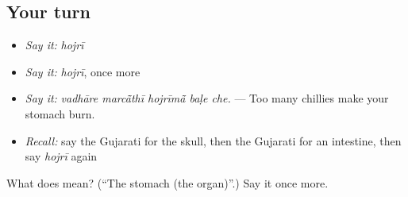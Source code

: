 \subsection*{Your turn}
\begin{itemize}
\raggedright
  \item \emph{Say it:} \emph{hojrī}
  \item \emph{Say it:} \emph{hojrī}, once more
  \item \emph{Say it:} \emph{vadhāre marcā̃thī hojrīmā̃ baḷe che.} — Too many chillies make your stomach burn.
  \item \emph{Recall:} say the Gujarati for the skull, then the Gujarati for an intestine, then say \emph{hojrī} again
\end{itemize}

\begin{tcolorbox}[breakable,colback=teal!4,colframe=teal!35!black,title={Before you move on}]
What does  mean? (\textquotedblleft{}The stomach (the organ)\textquotedblright{}.) Say it once more.
\end{tcolorbox}
